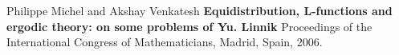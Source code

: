 \documentclass[12pt]{article}
\begin{document}
\newpage

\selectfont \fontsize{12}{10}\selectfont

\begin{thebibliography}{}

\item Philippe Michel and Akshay Venkatesh \textbf{Equidistribution, L-functions and ergodic theory: on some problems of Yu. Linnik} Proceedings of the International Congress
of Mathematicians, Madrid, Spain, 2006.

\end{thebibliography}
\end{document}
